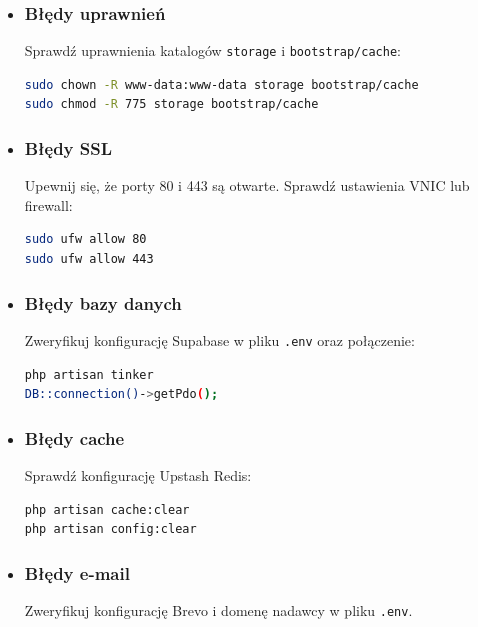 \documentclass[12pt,a4paper]{article}
\begin{document}
\begin{itemize}[itemsep=3pt]
    \item \subsubsection{Błędy uprawnień}Sprawdź uprawnienia katalogów \texttt{storage} i \texttt{bootstrap/cache}:
    \begin{lstlisting}[language=bash]
sudo chown -R www-data:www-data storage bootstrap/cache
sudo chmod -R 775 storage bootstrap/cache
    \end{lstlisting}
    
    \item \subsubsection{Błędy SSL} Upewnij się, że porty 80 i 443 są otwarte. Sprawdź ustawienia VNIC lub firewall:
    \begin{lstlisting}[language=bash]
sudo ufw allow 80
sudo ufw allow 443
    \end{lstlisting}
    
    \item \subsubsection{Błędy bazy danych} Zweryfikuj konfigurację Supabase w pliku \texttt{.env} oraz połączenie:
    \begin{lstlisting}[language=bash]
php artisan tinker
DB::connection()->getPdo();
    \end{lstlisting}
    
    \item \subsubsection{Błędy cache}Sprawdź konfigurację Upstash Redis:
    \begin{lstlisting}[language=bash]
php artisan cache:clear
php artisan config:clear
    \end{lstlisting}
    
    \item \subsubsection{Błędy e-mail} Zweryfikuj konfigurację Brevo i domenę nadawcy w pliku \texttt{.env}.
\end{itemize}
\end{document}
